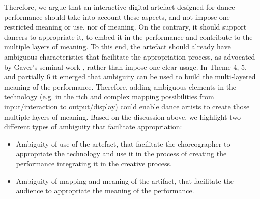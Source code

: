 Therefore, we argue that an interactive digital artefact designed for dance performance should take into account these aspects, and not impose one restricted meaning or use, nor of meaning. On the contrary, it should support dancers to appropriate it, to embed it in the performance and contribute to the multiple layers of meaning. To this end, the artefact should already have ambiguous characteristics that facilitate the appropriation process, as advocated by Gaver's seminal work \cite{gaver2003ambiguity}, rather than impose one clear usage. In Theme 4, 5, and partially 6 it emerged that ambiguity can be used to build the multi-layered meaning of the performance. Therefore, adding ambiguous elements in the technology (e.g. in the rich and complex mapping possibilities from input/interaction to output/display) could enable dance artists to create those multiple layers of meaning. Based on the discussion above, we highlight two different types of ambiguity that facilitate appropriation:
\begin{itemize}
\item Ambiguity of use of the artefact, that facilitate the choreographer to appropriate the technology and use it in the process of creating the performance integrating it in the creative process.
\item Ambiguity of mapping and meaning of the artifact, that facilitate the audience to appropriate the meaning of the performance.
\end{itemize}
